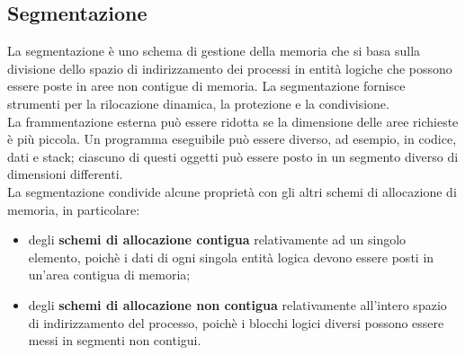\documentclass[12pt, letterpaper]{report}
\begin{document}
	\subsection{Segmentazione}
	La segmentazione è uno schema di gestione della memoria che si basa sulla divisione dello spazio di indirizzamento dei processi in entità logiche che possono essere poste in aree non contigue di memoria. La segmentazione fornisce strumenti per la rilocazione dinamica, la protezione e la condivisione. \\
	La frammentazione esterna può essere ridotta se la dimensione delle aree richieste è più piccola. Un programma eseguibile può essere diverso, ad esempio, in codice, dati e stack; ciascuno di questi oggetti può essere posto in un segmento diverso di dimensioni differenti. \\
	La segmentazione condivide alcune proprietà con gli altri schemi di allocazione di memoria, in particolare:
	\begin{itemize}
		\item degli \textbf{schemi di allocazione contigua} relativamente ad un singolo elemento, poichè i dati di ogni singola entità logica devono essere posti in un'area contigua di memoria;
		\item degli \textbf{schemi di allocazione non contigua} relativamente all'intero spazio di indirizzamento del processo, poichè i blocchi logici diversi possono essere messi in segmenti non contigui.
	\end{itemize}
\end{document}

